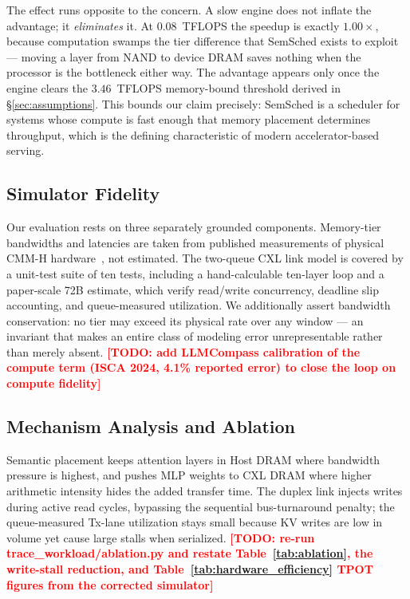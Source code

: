 \documentclass[10pt,conference,letterpaper]{IEEEtran}
\newcommand{\todo}[1]{\textcolor{red}{\textbf{[TODO: #1]}}}
\begin{document}
The effect runs opposite to the concern. A slow engine does not inflate the advantage; it \emph{eliminates} it. At $0.08$~TFLOPS the speedup is exactly $1.00\times$, because computation swamps the tier difference that SemSched exists to exploit --- moving a layer from NAND to device DRAM saves nothing when the processor is the bottleneck either way. The advantage appears only once the engine clears the $3.46$~TFLOPS memory-bound threshold derived in \S\ref{sec:assumptions}. This bounds our claim precisely: SemSched is a scheduler for systems whose compute is fast enough that memory placement determines throughput, which is the defining characteristic of modern accelerator-based serving.

\subsection{Simulator Fidelity}
\label{sec:fidelity}
\noindent
Our evaluation rests on three separately grounded components. Memory-tier bandwidths and latencies are taken from published measurements of physical CMM-H hardware~\cite{soltaniyeh2025revisiting}, not estimated. The two-queue CXL link model is covered by a unit-test suite of ten tests, including a hand-calculable ten-layer loop and a paper-scale 72B estimate, which verify read/write concurrency, deadline slip accounting, and queue-measured utilization. We additionally assert bandwidth conservation: no tier may exceed its physical rate over any window --- an invariant that makes an entire class of modeling error unrepresentable rather than merely absent. \todo{add LLMCompass calibration of the compute term (ISCA 2024, 4.1\% reported error) to close the loop on compute fidelity}

\subsection{Mechanism Analysis and Ablation}
\label{sec:mechanism}
\noindent
Semantic placement keeps attention layers in Host DRAM where bandwidth pressure is highest, and pushes MLP weights to CXL DRAM where higher arithmetic intensity hides the added transfer time. The duplex link injects writes during active read cycles, bypassing the sequential bus-turnaround penalty; the queue-measured Tx-lane utilization stays small because KV writes are low in volume yet cause large stalls when serialized. \todo{re-run trace\_workload/ablation.py and restate Table~\ref{tab:ablation}, the write-stall reduction, and Table~\ref{tab:hardware_efficiency} TPOT figures from the corrected simulator}
\end{document}
